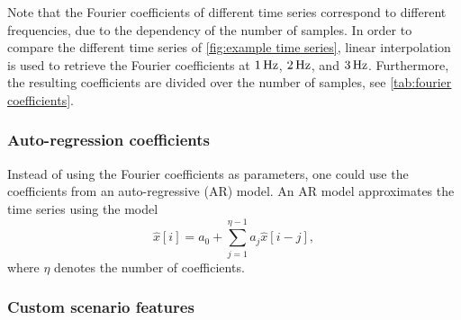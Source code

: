 \documentclass[10pt,final,a4paper,oneside,onecolumn]{article}
\theoremstyle{plain}\newtheorem{definition}{Definition}[section]    %
\theoremstyle{definition}\newtheorem{example}{Example}[section]     %
\theoremstyle{remark}\newtheorem{remarkenv}{Remark}[section]        %
\begin{document}
Note that the Fourier coefficients of different time series correspond to different frequencies, due to the dependency of the number of samples. In order to compare the different time series of \cref{fig:example time series}, linear interpolation is used to retrieve the Fourier coefficients at $\unit[1]{Hz}$, $\unit[2]{Hz}$, and $\unit[3]{Hz}$. Furthermore, the resulting coefficients are divided over the number of samples, see \cref{tab:fourier coefficients}.

\begin{table}
	\centering
	\caption{Interpolated Fourier coefficients for the different time series (see \cref{fig:example time series}) divided over the number of samples.}
	\label{tab:fourier coefficients}
	
\end{table}

\subsubsection{Auto-regression coefficients}
\label{sec:auto regression coefficients}
Instead of using the Fourier coefficients as parameters, one could use the coefficients from an auto-regressive (AR) model. An AR model approximates the time series using the model 
\begin{equation}
	\label{eq:auto-regression}
	\hat{x}[i] = a_0 + \sum_{j=1}^{\eta-1} a_j \hat{x}[i-j],
\end{equation}
where $\eta$ denotes the number of coefficients. 

\begin{table}
	\centering
	\caption{Coefficients of auto-regression model \cref{eq:auto-regression} with $\eta=3$ for the three time series of \cref{fig:example time series}.}
	\label{tab:ar coefficients}
	
\end{table}

\subsubsection{Custom scenario features}
\label{sec:custom features}

\begin{table}
	\centering
	\caption{Feature-based dissimilarity measures, according to \cref{eq:eucl features}, with Fourier coefficients (see \cref{sec:fourier coefficient}), auto-regression coefficients (see \cref{sec:auto regression coefficients}), and custom scenario features (see \cref{sec:custom features}).}
	\label{tab:feature based dissimilarity}
	
\end{table}

\printbibliography
\end{document}
